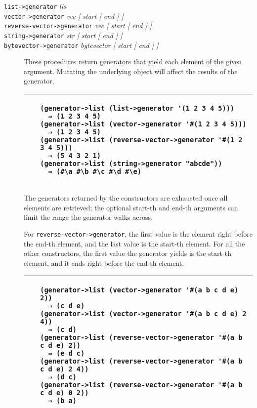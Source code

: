 \begin{description}
\item[\texttt{list-\textgreater{}generator} \emph{lis}\\
\texttt{vector-\textgreater{}generator} \emph{vec {[} start {[} end {]}
{]}}\\
\texttt{reverse-vector-\textgreater{}generator} \emph{vec {[} start {[}
end {]} {]}}\\
\texttt{string-\textgreater{}generator} \emph{str {[} start {[} end {]}
{]}}\\
\texttt{bytevector-\textgreater{}generator} \emph{bytevector {[} start
{[} end {]} {]}}]
These procedures return generators that yield each element of the given
argument. Mutating the underlying object will affect the results of the
generator.

\begin{longtable}[]{@{}ll@{}}
\toprule
\begin{minipage}[t]{0.47\columnwidth}\raggedright\strut
~\strut
\end{minipage} & \begin{minipage}[t]{0.47\columnwidth}\raggedright\strut
\begin{verbatim}
(generator->list (list->generator '(1 2 3 4 5)))
  ⇒ (1 2 3 4 5)
(generator->list (vector->generator '#(1 2 3 4 5)))
  ⇒ (1 2 3 4 5)
(generator->list (reverse-vector->generator '#(1 2 3 4 5)))
  ⇒ (5 4 3 2 1)
(generator->list (string->generator "abcde"))
  ⇒ (#\a #\b #\c #\d #\e)
\end{verbatim}
\strut
\end{minipage}\tabularnewline
\bottomrule
\end{longtable}

The generators returned by the constructors are exhausted once all
elements are retrieved; the optional start-th and end-th arguments can
limit the range the generator walks across.

For \texttt{reverse-vector-\textgreater{}generator}, the first value is
the element right before the end-th element, and the last value is the
start-th element. For all the other constructors, the first value the
generator yields is the start-th element, and it ends right before the
end-th element.

\begin{longtable}[]{@{}ll@{}}
\toprule
\begin{minipage}[t]{0.47\columnwidth}\raggedright\strut
~\strut
\end{minipage} & \begin{minipage}[t]{0.47\columnwidth}\raggedright\strut
\begin{verbatim}
(generator->list (vector->generator '#(a b c d e) 2))
  ⇒ (c d e)
(generator->list (vector->generator '#(a b c d e) 2 4))
  ⇒ (c d)
(generator->list (reverse-vector->generator '#(a b c d e) 2))
  ⇒ (e d c)
(generator->list (reverse-vector->generator '#(a b c d e) 2 4))
  ⇒ (d c)
(generator->list (reverse-vector->generator '#(a b c d e) 0 2))
  ⇒ (b a)
\end{verbatim}
\strut
\end{minipage}\tabularnewline
\bottomrule
\end{longtable}
\end{description}


